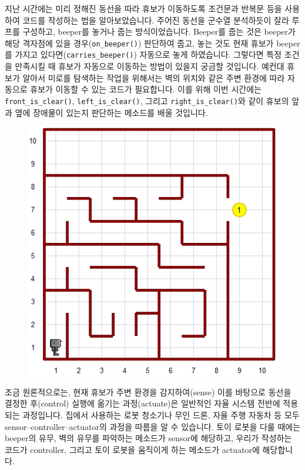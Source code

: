 \documentclass[../main.tex]{subfiles}
\begin{document}
지난 시간에는 미리 정해진 동선을 따라 휴보가 이동하도록 조건문과 반복문 등을 사용하여 코드를 작성하는 법을 알아보았습니다.
주어진 동선을 군수열 분석하듯이 잘라 루프를 구성하고, beeper를 놓거나 줍는 방식이었습니다.
Beeper를 줍는 것은 beeper가 해당 격자점에 있을 경우(\texttt{on\_beeper()}) 판단하여 줍고, 놓는 것도 현재 휴보가 beeper를 가지고 있다면(\texttt{carries\_beeper()}) 자동으로 놓게 하였습니다.
그렇다면 특정 조건을 만족시킬 때 휴보가 자동으로 이동하는 방법이 있을지 궁금할 것입니다.
예컨대 휴보가 알아서 미로를 탐색하는 작업을 위해서는 벽의 위치와 같은 주변 환경에 따라 자동으로 휴보가 이동할 수 있는 코드가 필요합니다.
이를 위해 이번 시간에는 \texttt{front\_is\_clear()}, \texttt{left\_is\_clear()}, 그리고 \texttt{right\_is\_clear()}와 같이 휴보의 앞과 옆에 장애물이 있는지 판단하는 메소드를 배울 것입니다.
\begin{figure}[H]
\centering
\includegraphics[width=0.5\linewidth]{"./lectures/lecture7_maze"}
\label{fig:lecture7maze}
\end{figure}

조금 원론적으로는, 현재 휴보가 주변 환경을 감지하여(sense) 이를 바탕으로 동선을 결정한 후(control) 실행에 옮기는 과정(actuate)은 일반적인 자율 시스템 전반에 적용되는 과정입니다.
집에서 사용하는 로봇 청소기나 무인 드론, 자율 주행 자동차 등 모두 sensor--controller--actuator의 과정을 따름을 알 수 있습니다.
토이 로봇을 다룰 때에는 beeper의 유무, 벽의 유무를 파악하는 메소드가 sensor에 해당하고, 우리가 작성하는 코드가 controller, 그리고 토이 로봇을 움직이게 하는 메소드가 actuator에 해당합니다.
\end{document}
